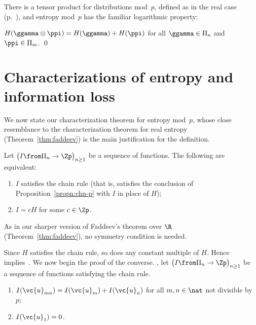 There is a tensor%
%
% 
product for distributions mod~$p$, defined as in the real case
(p.~\pageref{p:tensor}), and entropy mod~$p$ has the familiar logarithmic%
%
%
% 
property:

\begin{cor}
$H(\ggamma \otimes \ppi) = H(\ggamma) + H(\ppi)$ for all $\ggamma \in
  \Pi_n$ and $\ppi \in \Pi_m$.
\qed
\end{cor}


\section{Characterizations of entropy and information loss}


We now state our characterization theorem for entropy mod~$p$, whose close
resemblance to the characterization theorem for real entropy
(Theorem~\ref{thm:faddeev}) is the main justification for the definition.

\begin{thm}
%
%
%
%
Let $\bigl( I \from \Pi_n \to \Zp \bigr)_{n \geq 1}$ be a sequence of
functions.  The following are equivalent:
% 
\begin{enumerate}
\item 
{}
$I$ satisfies the chain rule (that is, satisfies the conclusion of
Proposition~\ref{propn:chn-p} with $I$ in place of $H$);

\item
{}
$I = cH$ for some $c \in \Zp$.
\end{enumerate}
\end{thm}

As in our sharper version of Faddeev's theorem over $\R$
(Theorem~\ref{thm:faddeev}), no symmetry condition is needed.

Since $H$ satisfies the chain rule, so does any constant multiple of $H$.
Hence~ implies~.
% 
We now begin the proof of the converse.  ,
let $\bigl( I \from \Pi_n \to \Zp \bigr)_{n \geq 1}$ be a sequence of
functions satisfying the chain rule.

\begin{lemma}
\begin{enumerate}
\item
{}
$I(\vc{u}_{mn}) = I(\vc{u}_m) + I(\vc{u}_n)$ for all $m, n \in \nat$ not
  divisible by $p$;

\item 
{}
$I(\vc{u}_1) = 0$.
\end{enumerate}
\end{lemma}

